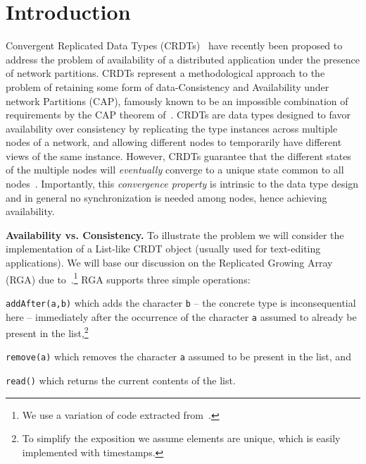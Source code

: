 \section{Introduction}
\label{sec:introduction}

Convergent Replicated Data Types (CRDTs)~\cite{ShapiroPBZ11} have
recently been proposed to address the problem of availability of a
distributed application under the presence of network partitions.
%
CRDTs represent a methodological approach to the problem of retaining
some form of data-Consistency and Availability under network Partitions (CAP),
famously known to be an impossible combination of requirements by the
CAP theorem of~\citet{GilbertL02}.
%
CRDTs are data types designed to favor availability over consistency
by replicating the type instances across multiple nodes of a
network, and allowing different nodes to temporarily have different
views of the same instance.
%
However, CRDTs guarantee that the different states of the multiple
nodes will \emph{eventually} converge to a unique state common to all
nodes~\cite{ShapiroPBZ11,Burckhardt14}.
%
Importantly, this \emph{convergence property} is intrinsic to the data
type design and in general no synchronization is needed among nodes,
hence achieving availability.

\smallskip
\noindent
{\bf Availability vs. Consistency.}
To illustrate the problem we will consider the implementation of a
List-like CRDT object (usually used for text-editing applications).
%
We will base our discussion on the Replicated Growing Array (RGA) due
to~\cite{RohJKL11}.\footnote{We use a variation of code extracted
  from~\cite{AttiyaBGMYZ16}.}
%
RGA supports three simple operations:
\begin{inparaenum}
\item \lstinline|addAfter(a,b)| which adds the character
  \lstinline|b| -- the concrete type is inconsequential here --
  immediately after the occurrence of the character \lstinline|a|
  assumed to already be present in the list,\footnote{To simplify the
    exposition we assume elements are unique, which is easily implemented
    with timestamps.}
\item \lstinline|remove(a)| which removes the character \lstinline|a|
  assumed to be present in the list, and
\item \lstinline|read()| which returns the current contents of the
  list.
\end{inparaenum}

